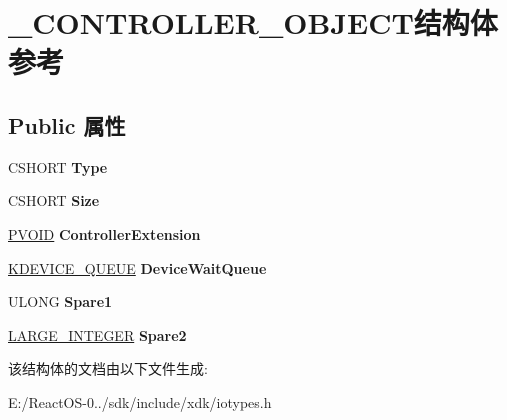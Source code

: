 \hypertarget{struct___c_o_n_t_r_o_l_l_e_r___o_b_j_e_c_t}{}\section{\+\_\+\+C\+O\+N\+T\+R\+O\+L\+L\+E\+R\+\_\+\+O\+B\+J\+E\+C\+T结构体 参考}
\label{struct___c_o_n_t_r_o_l_l_e_r___o_b_j_e_c_t}
\subsection*{Public 属性}
\begin{DoxyCompactItemize}
\item 
\mbox{\label{struct___c_o_n_t_r_o_l_l_e_r___o_b_j_e_c_t_a13bf783fcef93de0b939c8c8a1d68203}} 
C\+S\+H\+O\+RT {\bfseries Type}
\item 
\mbox{\label{struct___c_o_n_t_r_o_l_l_e_r___o_b_j_e_c_t_aec77538bceec31f8b5ce76f7e0992ff9}} 
C\+S\+H\+O\+RT {\bfseries Size}
\item 
\mbox{\label{struct___c_o_n_t_r_o_l_l_e_r___o_b_j_e_c_t_acd5341eccdb7eb5605b3fae649f2acf2}} 
\hyperlink{interfacevoid}{P\+V\+O\+ID} {\bfseries Controller\+Extension}
\item 
\mbox{\label{struct___c_o_n_t_r_o_l_l_e_r___o_b_j_e_c_t_a5f98068afc053eb45d4d3a5cce5c571d}} 
\hyperlink{struct___k_d_e_v_i_c_e___q_u_e_u_e}{K\+D\+E\+V\+I\+C\+E\+\_\+\+Q\+U\+E\+UE} {\bfseries Device\+Wait\+Queue}
\item 
\mbox{\label{struct___c_o_n_t_r_o_l_l_e_r___o_b_j_e_c_t_ab44359c0d3898cb0d210c2b3abaaa087}} 
U\+L\+O\+NG {\bfseries Spare1}
\item 
\mbox{\label{struct___c_o_n_t_r_o_l_l_e_r___o_b_j_e_c_t_a8fd3b02a4dd1cd8790741025cf609062}} 
\hyperlink{union___l_a_r_g_e___i_n_t_e_g_e_r}{L\+A\+R\+G\+E\+\_\+\+I\+N\+T\+E\+G\+ER} {\bfseries Spare2}
\end{DoxyCompactItemize}


该结构体的文档由以下文件生成\+:\begin{DoxyCompactItemize}
\item 
E\+:/\+React\+O\+S-\/0../sdk/include/xdk/iotypes.\+h\end{DoxyCompactItemize}

